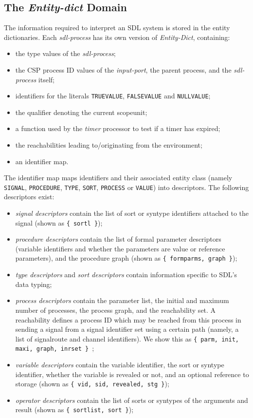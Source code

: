 \subsection{The {\em Entity-dict} Domain}

The information required to interpret an SDL system is stored in
the entity dictionaries. Each {\em sdl-process} has its own version of
{\em Entity-Dict}, containing:

\begin{itemize}
\item the type values of the {\em sdl-process};
\item the CSP process ID values of the {\em input-port}, the parent process,
and the {\em sdl-process} itself;
\item identifiers for the literals {\tt TRUEVALUE}, {\tt FALSEVALUE}
and {\tt NULLVALUE};
\item the qualifier denoting the current scopeunit;
\item a function used by the {\em timer} processor to test if a timer
has expired;
\item the reachabilities leading to/originating from the environment;
\item an identifier map.
\end{itemize}

The identifier map maps identifiers and their associated entity class
(namely {\tt SIGNAL}, {\tt PROCEDURE}, {\tt TYPE}, {\tt SORT}, {\tt PROCESS}
or {\tt VALUE}) into descriptors.
The following descriptors exist:

\begin{itemize}
\item {\em signal descriptors} contain the list of sort or syntype
identifiers attached to the signal (shown as {\tt \{ sortl \}});
\item {\em procedure descriptors} contain the list of formal parameter
descriptors (variable identifiers and whether the parameters are
value or reference parameters), and the procedure graph
(shown as {\tt \{ formparms, graph \}});
\item {\em type descriptors} and {\em sort descriptors} contain
information specific to SDL's data typing;
\item {\em process descriptors} contain the parameter list, the
initial and maximum number of processes, the process graph, and the
reachability set. A reachability defines a process ID which may be
reached from this process in sending a signal from a signal
identifier set using a certain path (namely, a list of signalroute
and channel identifiers). We show this as
{\tt \{ parm, init, maxi, graph, inrset \} };
\item {\em variable descriptors} contain the variable identifier, the
sort or syntype identifier, whether the variable is revealed or not,
and an optional reference to storage
(shown as {\tt \{ vid, sid, revealed, stg \}});
\item {\em operator descriptors} contain the list of sorts or
syntypes of the arguments and result (shown as 
{\tt \{ sortlist, sort \}});
\end{itemize}

